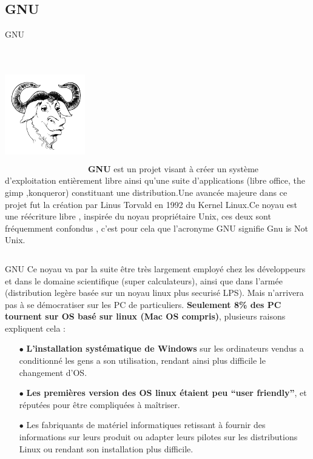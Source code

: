 \subsection{GNU}
\begin{frame}[t,fragile]{GNU}
    \fontsize{8}{10.5}\selectfont 
     \begin{columns}
            \centering
                \includegraphics[height=5cm, width=3.5cm]{gerwinski-gnu-head}
        \textbf{GNU} est un projet visant à créer un système d’exploitation entièrement libre ainsi qu'une suite d’applications (libre office, the gimp ,konqueror) constituant une distribution.\linebreak Une avancée majeure dans ce projet fut la création par Linus Torvald en 1992 du Kernel Linux.\linebreak Ce noyau est une réécriture libre , inspirée du noyau propriétaire Unix, ces deux sont fréquemment confondus , c’est pour cela que l’acronyme GNU signifie Gnu is Not Unix.
    \end{columns}
\end{frame}

\begin{frame}[t,fragile]{GNU}
    \fontsize{9}{10.5}\selectfont
    Ce noyau va par la suite être très largement employé chez les développeurs et dans le domaine scientifique (super calculateurs), ainsi que dans l’armée (distribution legère basée sur un noyau linux plus securisé LPS). Mais n’arrivera pas à se démocratiser sur les PC de particuliers.\textbf{ Seulement 8\% des PC tournent sur OS basé sur linux (Mac OS compris)}, plusieurs raisons expliquent cela : \pause
    \begin{itemize}[<+->]
        \item[$\bullet$] \textbf{L’installation systématique de Windows} sur les ordinateurs vendus a conditionné les gens a son utilisation, rendant ainsi plus difficile le changement d’OS.%
        \item[$\bullet$] \textbf{Les premières version des OS linux étaient peu “user friendly”}, et réputées pour être compliquées à maîtriser. %
        \item[$\bullet$] Les fabriquants de matériel informatiques retissant à fournir des informations sur leurs produit ou adapter leurs pilotes sur les distributions Linux ou rendant son installation plus difficile.
    \end{itemize}
\end{frame}

